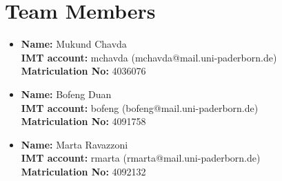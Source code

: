 \documentclass[runningheads]{llncs}
\begin{document}
\section*{Team Members}
\begin{itemize}
    \item \textbf{Name:} Mukund Chavda \\
    \textbf{IMT account:} mchavda (mchavda@mail.uni-paderborn.de) \\
    \textbf{Matriculation No:} 4036076

    \item \textbf{Name:} Bofeng Duan \\
    \textbf{IMT account:} bofeng (bofeng@mail.uni-paderborn.de) \\
    \textbf{Matriculation No:} 4091758

    \item \textbf{Name:} Marta Ravazzoni \\
    \textbf{IMT account:} rmarta (rmarta@mail.uni-paderborn.de) \\
    \textbf{Matriculation No:} 4092132
\end{itemize}
\end{document}
